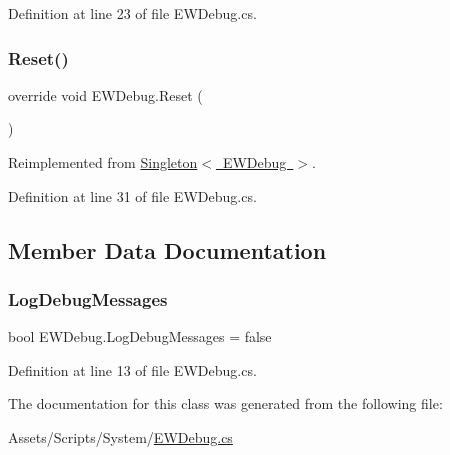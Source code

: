 Definition at line 23 of file E\+W\+Debug.\+cs.

\mbox{\label{class_e_w_debug_aac177b62905530131ea9a05026f95725}} 
\subsubsection{\texorpdfstring{Reset()}{Reset()}}
{\footnotesize\ttfamily override void E\+W\+Debug.\+Reset (\begin{DoxyParamCaption}{ }\end{DoxyParamCaption})\hspace{0.3cm}{\ttfamily [virtual]}}



Reimplemented from \mbox{\hyperlink{class_singleton_a35f0214fbbe0e59abe738b18a2377647}{Singleton$<$ E\+W\+Debug $>$}}.



Definition at line 31 of file E\+W\+Debug.\+cs.



\subsection{Member Data Documentation}
\mbox{\label{class_e_w_debug_a7402f5700ecb03b56bf3948419f0ffcd}} 
\subsubsection{\texorpdfstring{Log\+Debug\+Messages}{LogDebugMessages}}
{\footnotesize\ttfamily bool E\+W\+Debug.\+Log\+Debug\+Messages = false}



Definition at line 13 of file E\+W\+Debug.\+cs.



The documentation for this class was generated from the following file\+:\begin{DoxyCompactItemize}
\item 
Assets/\+Scripts/\+System/\mbox{\hyperlink{_e_w_debug_8cs}{E\+W\+Debug.\+cs}}\end{DoxyCompactItemize}
